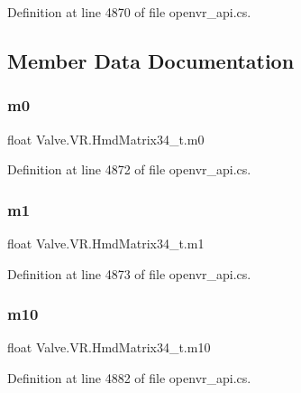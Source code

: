 Definition at line 4870 of file openvr\+\_\+api.\+cs.



\subsection{Member Data Documentation}
\mbox{\label{struct_valve_1_1_v_r_1_1_hmd_matrix34__t_ae76083ee16462a47961bc62b55ec95dd}} 
\subsubsection{\texorpdfstring{m0}{m0}}
{\footnotesize\ttfamily float Valve.\+V\+R.\+Hmd\+Matrix34\+\_\+t.\+m0}



Definition at line 4872 of file openvr\+\_\+api.\+cs.

\mbox{\label{struct_valve_1_1_v_r_1_1_hmd_matrix34__t_a38aa08a6a6c6a064a9588fb3531b1ac3}} 
\subsubsection{\texorpdfstring{m1}{m1}}
{\footnotesize\ttfamily float Valve.\+V\+R.\+Hmd\+Matrix34\+\_\+t.\+m1}



Definition at line 4873 of file openvr\+\_\+api.\+cs.

\mbox{\label{struct_valve_1_1_v_r_1_1_hmd_matrix34__t_a9dd6a3e4f4e4d9b2314e009e8e63f5f7}} 
\subsubsection{\texorpdfstring{m10}{m10}}
{\footnotesize\ttfamily float Valve.\+V\+R.\+Hmd\+Matrix34\+\_\+t.\+m10}



Definition at line 4882 of file openvr\+\_\+api.\+cs.

